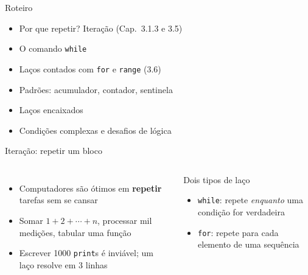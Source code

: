 \documentclass[aspectratio=169,10pt,t]{beamer}
\begin{document}
\capa

\begin{frame}{Roteiro}
  \begin{itemize}
    \item Por que repetir? Iteração (Cap.~3.1.3 e 3.5)
    \item O comando \texttt{while}
    \item Laços contados com \texttt{for} e \texttt{range} (3.6)
    \item Padrões: acumulador, contador, sentinela
    \item Laços encaixados
    \item Condições complexas e desafios de lógica
  \end{itemize}
\end{frame}

\begin{frame}{Iteração: repetir um bloco}
  \begin{columns}[T]
    \begin{itemize}
      \item Computadores são ótimos em \textbf{repetir} tarefas sem se cansar
      \item Somar \(1+2+\cdots+n\), processar mil medições, tabular uma função
      \item Escrever 1000 \texttt{print}s é inviável; um laço resolve em 3 linhas
    \end{itemize}
    \begin{block}{Dois tipos de laço}
      \begin{itemize}\small
        \item \texttt{while}: repete \emph{enquanto} uma condição for verdadeira
        \item \texttt{for}: repete para cada elemento de uma sequência
      \end{itemize}
    \end{block}
  \end{columns}
\end{frame}
\end{document}
